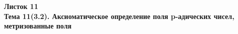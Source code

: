 \documentclass[a4paper, 11pt]{article}
\begin{document}
\begin{center} \Large \bf Листок 11\\ Тема 11(3.2). Аксиоматическое определение поля p-адических чисел, метризованные поля \end{center}


\end{document}
